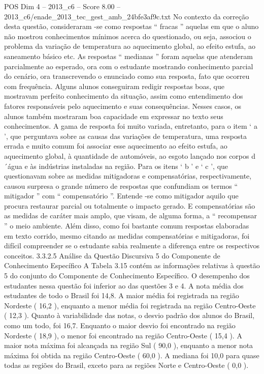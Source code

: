 \begin{textsample}{POS Dim 4 – 2013\_c6 – Score 8.00 – 2013\_c6/enade\_2013\_tec\_gest\_amb\_24bfe3af9c.txt}
No contexto da correção desta questão, consideraram -se como respostas “ fracas ” aquelas em que o aluno não mostrou conhecimentos mínimos acerca do questionado, ou seja, associou o problema da variação de temperatura ao aquecimento global, ao efeito estufa, ao saneamento básico etc.
As respostas “ medianas ” foram aquelas que atenderam parcialmente ao esperado, ora com o estudante mostrando conhecimento parcial do cenário, ora transcrevendo o enunciado como sua resposta, fato que ocorreu com frequência.
Alguns alunos conseguiram redigir respostas boas, que mostravam perfeito conhecimento da situação, assim como entendimento dos fatores responsáveis pelo aquecimento e suas consequências.
Nesses casos, os alunos também mostraram boa capacidade em expressar no texto seus conhecimentos.
A gama de resposta foi muito variada, entretanto, para o item ‘ a ’, que perguntava sobre as causas das variações de temperatura, uma resposta errada e muito comum foi associar esse aquecimento ao efeito estufa, ao aquecimento global, à quantidade de automóveis, ao esgoto lançado nos corpos d´água e às indústrias instaladas na região.
Para os itens ‘ b ’ e ‘ c ’, que questionavam sobre as medidas mitigadoras e compensatórias, respectivamente, causou surpresa o grande número de respostas que confundiam os termos “ mitigador ” com “ compensatório ”.
Entende -se como mitigador aquilo que procura restaurar parcial ou totalmente o impacto gerado.
E compensatórias são as medidas de caráter mais amplo, que visam, de alguma forma, a “ recompensar ” o meio ambiente.
Além disso, como foi bastante comum respostas elaboradas em texto corrido, mesmo citando as medidas compensatórias e mitigadoras, foi difícil compreender se o estudante sabia realmente a diferença entre os respectivos conceitos. 3.3.2.5 Análise da Questão Discursiva 5 do Componente de Conhecimento Específico A Tabela 3.15 contém as informações relativas à questão 5 do conjunto do Componente de Conhecimento Específico.
O desempenho dos estudantes nessa questão foi inferior ao das questões 3 e 4.
A nota média dos estudantes de todo o Brasil foi 14,8.
A maior média foi registrada na região Nordeste ( 16,2 ), enquanto a menor média foi registrada na região Centro-Oeste ( 12,3 ).
Quanto à variabilidade das notas, o desvio padrão dos alunos do Brasil, como um todo, foi 16,7.
Enquanto o maior desvio foi encontrado na região Nordeste ( 18,9 ), o menor foi encontrado na região Centro-Oeste ( 15,4 ).
A maior nota máxima foi alcançada na região Sul ( 90,0 ), enquanto a menor nota máxima foi obtida na região Centro-Oeste ( 60,0 ).
A mediana foi 10,0 para quase todas as regiões do Brasil, exceto para as regiões Norte e Centro-Oeste ( 0,0 ).

\end{textsample}
